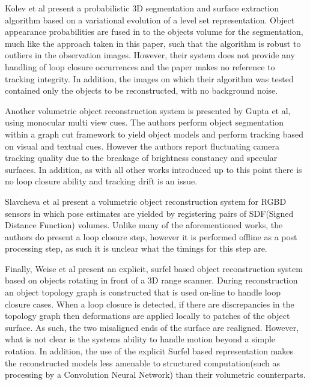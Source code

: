 Kolev et al present a probabilistic 3D segmentation and surface extraction algorithm\cite{Kolev2006} based on a variational evolution of a level 
set representation. Object appearance probabilities are fused in to the objects volume for the segmentation, much like the approach taken in 
this paper, such that the algorithm is robust to outliers in the observation images. However, their system does not provide any handling of 
loop closure occurrences and the paper makes no reference to tracking integrity. In addition, the images on which their algorithm was tested 
contained only the objects to be reconstructed, with no background noise.

Another volumetric object reconstruction system is presented by Gupta et al\cite{Gupta2016}, using monocular multi view cues. The authors 
perform object segmentation within a graph cut framework to yield object models and perform tracking based on visual and textual cues. 
However the authors report fluctuating camera tracking quality due to the breakage of brightness constancy and specular surfaces. In addition, 
as with all other works introduced up to this point there is no loop closure ability and tracking drift is an issue.

Slavcheva et al present a volumetric object reconstruction system for RGBD sensors in which pose estimates are yielded by registering pairs of 
SDF(Signed Distance Function) volumes. Unlike many of the aforementioned works, the authors do present a loop closure step, however it is 
performed offline as a post processing step, as such it is unclear what the timings for this step are.

Finally, Weise et al present an explicit, surfel based object reconstruction system\cite{Weise2009} based on objects rotating in front of a 3D 
range scanner. During reconstruction an object topology graph is constructed that is used on-line to handle loop closure cases. When a loop 
closure is detected, if there are discrepancies in the topology graph then deformations are applied locally to patches of the object surface. As 
such, the two misaligned ends of the surface are realigned. However, what is not clear is the systems ability to handle motion beyond a simple 
rotation. In addition, the use of the explicit Surfel based representation makes the reconstructed models less amenable to structured  computation(such as processing by a Convolution Neural Network) than their volumetric counterparts.